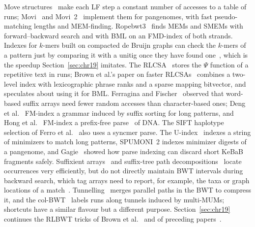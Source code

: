 Move structures~\cite{NishimotoTabei2021} make each LF step a constant number of accesses to a table of runs; Movi~\cite{ZakeriEtAl2024} and Movi~2~\cite{ZakeriEtAl2026} implement them for pangenomes, with fast pseudo-matching lengths and MEM-finding.
Ropebwt3~\cite{Li2024} finds MEMs and SMEMs with forward--backward search and with BML on an FMD-index of both strands.
Indexes for $k$-mers built on compacted de Bruijn graphs can check the $k$-mers of a pattern just by comparing it with a unitig once they have found one~\cite{Pibiri2022}, which is the speedup Section~\ref{sec:chr19} imitates.
The RLCSA~\cite{MakinenEtAl2010} stores the $\Psi$ function of a repetitive text in runs; Brown et al.'s paper on faster RLCSAs~\cite{BrownEtAlRLCSA} combines a two-level index with lexicographic phrase ranks and a sparse mapping bitvector, and speculates about using it for BML.
Ferragina and Fischer~\cite{FerraginaFischer2007} observed that word-based suffix arrays need fewer random accesses than character-based ones; Deng et al.~\cite{DengEtAl2022} FM-index a grammar induced by suffix sorting for long patterns, and Hong et al.~\cite{HongEtAl2024} FM-index a prefix-free parse~\cite{BoucherEtAl2019} of DNA.
The SIFT haplotype selection of Ferro et al.~\cite{FerroEtAl} also uses a syncmer parse.
The U-index~\cite{AyadEtAl2025} indexes a string of minimizers to match long patterns, SPUMONI~2 indexes minimizer digests of a pangenome, and Gagie~\cite{Gagie2026pseudo} showed how parse indexing can discard short KeBaB fragments safely.
Suffixient arrays~\cite{CenzatoEtAl2024} and suffix-tree path decompositions~\cite{BeckerEtAl2026} locate occurrences very efficiently, but do not directly maintain BWT intervals during backward search, which tag arrays need to report, for example, the taxa or graph locations of a match~\cite{BalazEtAl2024}.
Tunnelling~\cite{Baier2018,AlankoEtAl2019,GogaBalaz2022} merges parallel paths in the BWT to compress it, and the col-BWT~\cite{BrownEtAl2026} labels runs along tunnels induced by multi-MUMs; shortcuts have a similar flavour but a different purpose.
Section~\ref{sec:chr19} continues the RLBWT tricks of Brown et al.~\cite{BrownEtAl2022} and of preceding papers~\cite{OhlebuschEtAl2018,Manzini2016}.
